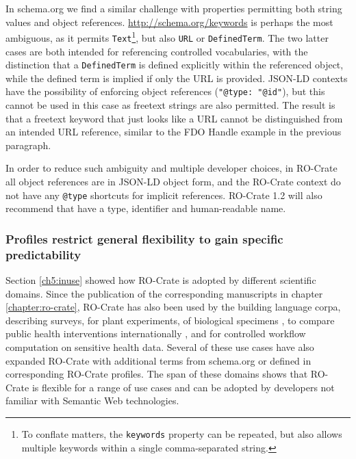 In schema.org we find a similar challenge with properties permitting both string values and object references. \url{http://schema.org/keywords} is perhaps the most ambiguous, as it permits \texttt{Text}\footnote{To conflate matters, the \texttt{keywords} property can be repeated, but also allows multiple keywords within a single comma-separated string.}, but also \texttt{URL} or \texttt{DefinedTerm}.
The two latter cases are both intended for referencing controlled vocabularies, with the distinction that a \texttt{DefinedTerm} is defined explicitly within the referenced object, while the defined term is implied if only the URL is provided.
JSON-LD contexts have the possibility of enforcing object references (\texttt{"@type: "@id"}), but this cannot be used in this case as freetext strings are also permitted.
The result is that a freetext keyword that just looks like a URL cannot be distinguished from an intended URL reference, similar to the FDO Handle example in the previous paragraph.

In order to reduce such ambiguity and multiple developer choices, in RO-Crate all object references are in JSON-LD object form, and the RO-Crate context do not have any \texttt{@type} shortcuts for implicit references.
RO-Crate 1.2 will also recommend that  have a type, identifier and human-readable name. 


\subsubsection{Profiles restrict general flexibility to gain specific predictability}
\label{ch61:profiles}

Section \vref{ch5:inuse} showed how RO-Crate is adopted by different scientific domains. 
Since the publication of the corresponding manuscripts in chapter \ref{chapter:ro-crate}, RO-Crate has also been used by the  \cite{LREC2022} building language corpa,  \cite{surveyOntology} describing surveys,  for plant experiments,  of biological specimens \cite{Wittner 2020,Wittner 2023,Wittner 2023b},  to compare public health interventions internationally \cite{Meurisse 2023}, and  for controlled workflow computation on sensitive health data. Several of these use cases have also expanded RO-Crate with additional terms from schema.org or defined in corresponding RO-Crate profiles. The span of these domains shows that RO-Crate is flexible for a range of use cases and can be adopted by developers not familiar with Semantic Web technologies.

